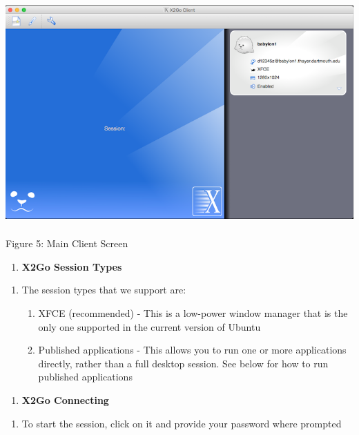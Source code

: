 \documentclass[
]{article}
\begin{document}
\includegraphics[width=5.50787in,height=3.38189in]{images/media/image5.png}

Figure 5: Main Client Screen

\begin{enumerate}
\def\labelenumi{\Alph{enumi}.}
\setcounter{enumi}{2}
\item
  \textbf{X2Go Session Types}
\end{enumerate}

\begin{enumerate}
\def\labelenumi{\arabic{enumi}.}
\setcounter{enumi}{8}
\item
  The session types that we support are:

  \begin{enumerate}
  \def\labelenumii{\arabic{enumii}.}
  \item
    XFCE (recommended) - This is a low-power window manager that is the
    only one supported in the current version of Ubuntu
  \item
    Published applications - This allows you to run one or more
    applications directly, rather than a full desktop session. See below
    for how to run published applications
  \end{enumerate}
\end{enumerate}

\begin{enumerate}
\def\labelenumi{\Alph{enumi}.}
\setcounter{enumi}{3}
\item
  \textbf{X2Go Connecting}
\end{enumerate}

\begin{enumerate}
\def\labelenumi{\arabic{enumi}.}
\setcounter{enumi}{9}
\item
  To start the session, click on it and provide your password where
  prompted
\end{enumerate}
\end{document}

